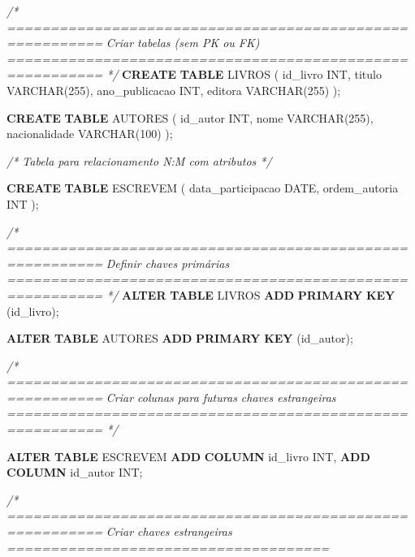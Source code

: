 \documentclass[
]{book}
\newenvironment{Shaded}{\begin{snugshade}}{\end{snugshade}}
\newcommand{\CommentTok}[1]{\textcolor[rgb]{0.56,0.35,0.01}{\textit{#1}}}
\newcommand{\DataTypeTok}[1]{\textcolor[rgb]{0.13,0.29,0.53}{#1}}
\newcommand{\DecValTok}[1]{\textcolor[rgb]{0.00,0.00,0.81}{#1}}
\newcommand{\KeywordTok}[1]{\textcolor[rgb]{0.13,0.29,0.53}{\textbf{#1}}}
\newcommand{\NormalTok}[1]{#1}
\begin{document}
\begin{Shaded}
\begin{Highlighting}[]

\CommentTok{/* =========================================================}
\CommentTok{   Criar tabelas (sem PK ou FK)}
\CommentTok{   ========================================================= */}
\KeywordTok{CREATE} \KeywordTok{TABLE}\NormalTok{ LIVROS }
\NormalTok{(}
\NormalTok{    id\_livro }\DataTypeTok{INT}\NormalTok{,}
\NormalTok{    titulo }\DataTypeTok{VARCHAR}\NormalTok{(}\DecValTok{255}\NormalTok{),}
\NormalTok{    ano\_publicacao }\DataTypeTok{INT}\NormalTok{,}
\NormalTok{    editora }\DataTypeTok{VARCHAR}\NormalTok{(}\DecValTok{255}\NormalTok{)}
\NormalTok{);}

\KeywordTok{CREATE} \KeywordTok{TABLE}\NormalTok{ AUTORES }
\NormalTok{(}
\NormalTok{    id\_autor }\DataTypeTok{INT}\NormalTok{,}
\NormalTok{    nome }\DataTypeTok{VARCHAR}\NormalTok{(}\DecValTok{255}\NormalTok{),}
\NormalTok{    nacionalidade }\DataTypeTok{VARCHAR}\NormalTok{(}\DecValTok{100}\NormalTok{)}
\NormalTok{);}

\CommentTok{/* Tabela para relacionamento N:M com atributos */}

\KeywordTok{CREATE} \KeywordTok{TABLE}\NormalTok{ ESCREVEM }
\NormalTok{(}
\NormalTok{    data\_participacao }\DataTypeTok{DATE}\NormalTok{,}
\NormalTok{    ordem\_autoria }\DataTypeTok{INT}
\NormalTok{);}

\CommentTok{/* =========================================================}
\CommentTok{   Definir chaves primárias}
\CommentTok{   ========================================================= */}
\KeywordTok{ALTER} \KeywordTok{TABLE}\NormalTok{ LIVROS }\KeywordTok{ADD} \KeywordTok{PRIMARY} \KeywordTok{KEY}\NormalTok{ (id\_livro);}

\KeywordTok{ALTER} \KeywordTok{TABLE}\NormalTok{ AUTORES }\KeywordTok{ADD} \KeywordTok{PRIMARY} \KeywordTok{KEY}\NormalTok{ (id\_autor);}

\CommentTok{/* =========================================================}
\CommentTok{   Criar colunas para futuras chaves estrangeiras}
\CommentTok{   ========================================================= */}

\KeywordTok{ALTER} \KeywordTok{TABLE}\NormalTok{ ESCREVEM }\KeywordTok{ADD} \KeywordTok{COLUMN}\NormalTok{ id\_livro }\DataTypeTok{INT}\NormalTok{, }\KeywordTok{ADD} \KeywordTok{COLUMN}\NormalTok{ id\_autor }\DataTypeTok{INT}\NormalTok{;}

\CommentTok{/* =========================================================}
\CommentTok{   Criar chaves estrangeiras}
\CommentTok{   =====================================}


\end{Highlighting}
\end{Shaded}
\end{document}
